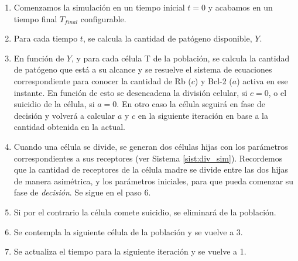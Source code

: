 \begin{enumerate}
	\item Comenzamos la simulación en un tiempo inicial $t=0$ y acabamos en un tiempo final $T_{final}$ configurable.
	
	\item Para cada tiempo $t$, se calcula la cantidad de patógeno disponible, $Y$. 
	
	\item En función de $Y$, y para cada célula T de la población, se calcula la cantidad de patógeno que está a su alcance y se resuelve el sistema de ecuaciones correspondiente para conocer la cantidad de Rb ($c$) y Bcl-2 ($a$) activa en ese instante. En función de esto se desencadena la división celular, si $c = 0$, o el suicidio de la célula, si $a = 0$. En otro caso la célula seguirá en fase de decisión y volverá a calcular $a$ y $c$ en la siguiente iteración en base a la cantidad obtenida en la actual.
	
	\item Cuando una célula se divide, se generan dos células hijas con los parámetros correspondientes a sus receptores (ver Sistema \ref{sist:div_sim}). Recordemos que la cantidad de receptores de la célula madre se divide entre las dos hijas de manera asimétrica, y los parámetros iniciales, para que pueda comenzar su fase de \textit{decisión}. Se sigue en el paso 6.
	
	\item Si por el contrario la célula comete suicidio, se eliminará de la población. 

	\item Se contempla la siguiente célula de la población y se vuelve a 3.
	
	\item Se actualiza el tiempo para la siguiente iteración y se vuelve a 1.
\end{enumerate}


